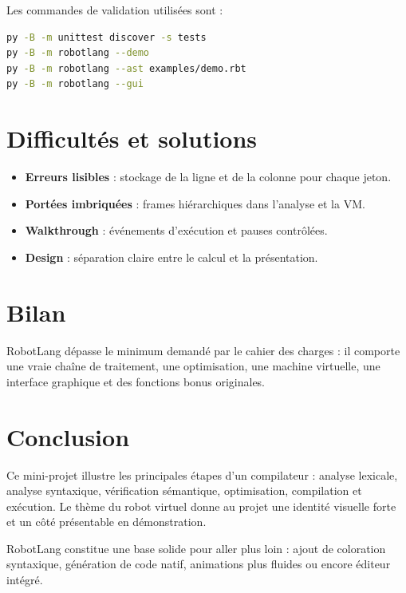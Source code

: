 \documentclass[12pt,a4paper]{article}
\begin{document}
\begin{futuristicbox}
Les commandes de validation utilisées sont :
\begin{lstlisting}[language=bash]
py -B -m unittest discover -s tests
py -B -m robotlang --demo
py -B -m robotlang --ast examples/demo.rbt
py -B -m robotlang --gui
\end{lstlisting}
\end{futuristicbox}

\section{Difficultés et solutions}

\begin{itemize}[nosep]
  \item \textbf{Erreurs lisibles} : stockage de la ligne et de la colonne pour chaque jeton.
  \item \textbf{Portées imbriquées} : frames hiérarchiques dans l'analyse et la VM.
  \item \textbf{Walkthrough} : événements d'exécution et pauses contrôlées.
  \item \textbf{Design} : séparation claire entre le calcul et la présentation.
\end{itemize}

\section{Bilan}

\begin{darkbox}
RobotLang dépasse le minimum demandé par le cahier des charges : il comporte une vraie
chaîne de traitement, une optimisation, une machine virtuelle, une interface graphique et
des fonctions bonus originales.
\end{darkbox}

\section{Conclusion}

Ce mini-projet illustre les principales étapes d'un compilateur : analyse lexicale,
analyse syntaxique, vérification sémantique, optimisation, compilation et exécution.
Le thème du robot virtuel donne au projet une identité visuelle forte et un côté
présentable en démonstration.

RobotLang constitue une base solide pour aller plus loin : ajout de coloration syntaxique,
génération de code natif, animations plus fluides ou encore éditeur intégré.
\end{document}

